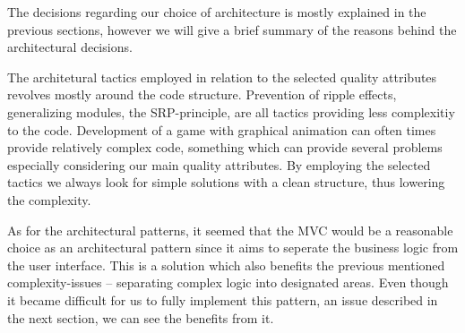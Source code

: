 The decisions regarding our choice of architecture is mostly explained in the previous sections, however we will give a brief summary of the reasons behind the architectural decisions.

The architetural tactics employed in relation to the selected quality attributes revolves mostly around the code structure. Prevention of ripple effects, generalizing modules, the SRP-principle, are all tactics providing less complexitiy to the code. Development of a game with graphical animation can often times provide relatively complex code, something which can provide several problems especially considering our main quality attributes. By employing the selected tactics we always look for simple solutions with a clean structure, thus lowering the complexity.

As for the architectural patterns, it seemed that the MVC would be a reasonable choice as an architectural pattern since it aims to seperate the business logic from the user interface. This is a solution which also benefits the previous mentioned complexity-issues -- separating complex logic into designated areas. Even though it became difficult for us to fully implement this pattern, an issue described in the next section, we can see the benefits from it.    
